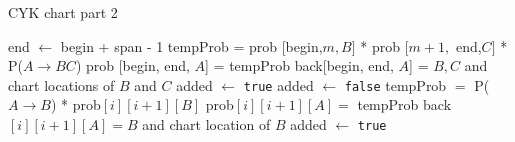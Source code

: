 \documentclass[11pt,twocolumn]{article}
\begin{document}
\begin{algorithm*}[!htb]
\caption{CYK chart part 2}
\label{cyk2}
\begin{algorithmic}[1]
             \State end $\gets$ begin + span - 1
                            \State tempProb = prob [begin,$ m, B]$ * prob $[m + 1,$ end,$ C]$ * P($A \rightarrow BC$) 
                              \State  prob [begin, end, $A$] = tempProb
                              \State  back[begin, end, $A$] = $B, C$ and chart locations of $B$ and $C$
                              \EndIf
				 \State added $\gets$ \texttt{true}
			\State added $\gets$ \texttt{false}
					\State tempProb $=$ P($A \rightarrow B$) * prob$[i][i+1][B]$
						\State prob$[i][i+1][A] =$ tempProb
						\State back$[i][i+1] [A] = B$ and chart location of $B$
						\State added $\gets$ \texttt{true}
					\EndIf
				\EndIf
			\EndFor
		\EndWhile
\EndFor
\EndFor
\EndFor
\EndFor
\EndFor
\EndFor
\EndProcedure
\end{algorithmic}
\end{algorithm*}
\end{document}
